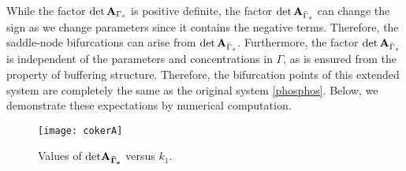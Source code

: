 \documentclass[ amsmath,amssymb,nofootinbib
]{revtex4-1}
\def\bal#1\eal{\begin{align}#1\end{align}}
\newcommand{\non}{\nonumber}
\newcommand{\detA}{{\rm det}\,  {\bf A}}
\newcommand{\gs}{{\Gamma_s}}
\newcommand{\gbs}{{\bar{\Gamma}_s}}
\begin{document}
\begin{comment}
 0 & 0 & 0 & 0 & 0 & 0 & 1 & 1 & 1 & 0 & 0 & 0 & 0 & 0 & 0 & 0 & 0 & 0 & 0 & 0 & 0 \\
 0 & 0 & 0 & 0 & 0 & 0 & 0 & 0 & 0 & 1 & 1 & 0 & 1 & 0 & 0 & 0 & 0 & 0 & 0 & 0 & 0 \\
 0 & 0 & 0 & 0 & 0 & 0 & 0 & 0 & 0 & 0 & 0 & 1 & 1 & 0 & 0 & 0 & 0 & 0 & 0 & 0 & 0
\end{array}
\right),
\eal
}
and the determinant is {\scriptsize
\bal
&\biggl(\left(-k_2-k_3\right) k_7 k_{10} k_{12} x_7 \left(k_4 k_6 x_2 x_4-k_9 x_7  \left(k_4 x_4+k_5+k_6\right)\right)\non \\
& +k_1 (k_3 x_2 (k_4 (k_7 k_9 k_{10} x_4
x_7^2+k_7 x_7 \left(k_6 \left(k_{11}+k_{12}\right) x_2+k_9 \left(\left(x_1+x_2+x_4\right) \left(k_{10} x_4+k_{11}+k_{12}\right)+k_{10} x_4 x_6\right)\right)\non \\
&+k_6 x_2 \left(\left(k_8+k_9\right) \left(k_{10} x_4+k_{11}+k_{12}\right)+k_7 \left(k_{11}+k_{12}\right) x_6\right))
+\left(k_5+k_6\right) k_7 k_9 x_7 \left(k_{10} \left(x_4+x_6+x_7\right)+k_{11}+k_{12}\right))\non \\
&+k_{10} k_{12} x_7 \left(\left(k_5+k_6\right) k_7 k_9 \left(x_1+x_2\right) x_7-k_4 k_6 x_2 x_4 \left(k_7 \left(x_1+x_2+x_4+x_6+x_7\right)+k_8+k_9\right)\right)) \biggr )\non \\  & \times \underset{{\rm det}{\bf A}_\Gamma}{\underbrace{ \biggl(\left(k_{14} x_1+k_{13} x_4\right) \left(k_{15} x_{10}+k_{16}\right)+k_{14} k_{15} x_1 x_{12}\biggr)}}
\eal}
\end{comment}

While the factor ${\rm det}\, {\bf A}_\gs$ is positive definite,  the factor ${\rm det}\,{\bf A}_{\gbs}$ can change the sign as we change parameters since it contains the negative terms. Therefore, the saddle-node bifurcations can arise from $\detA_\gbs$. Furthermore, the factor ${\rm det}\, {\bf A}_\gbs$ is  independent of  the parameters and concentrations in $\Gamma$, as is ensured from the property of  buffering structure. Therefore, the bifurcation points of this extended system are completely the same as the original system \eqref{phosphos}. Below, we demonstrate these expectations by numerical computation.



\begin{figure}[htbp]
\centering
  \texttt{[image: cokerA]}
   \caption{Values of  ${\rm det} \bf A_\gbs$ versus $k_1$. }
   \label{fig:detA}
\end{figure}
\end{document}
